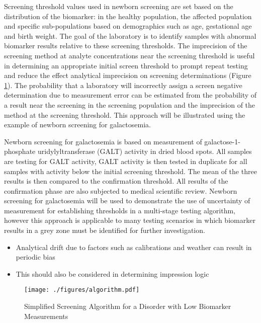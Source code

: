 \documentclass[review]{elsarticle}
\begin{document}
Screening threshold values used in newborn screening are set based on
the distribution of the biomarker: in the healthy population, the
affected population and specific sub-populations based on demographics
such as age, gestational age and birth weight. The goal of the
laboratory is to identify samples with abnormal biomarker results
relative to these screening thresholds. The imprecision of the
screening method at analyte concentrations near the screening
threshold is useful in determining an appropriate initial screen
threshold to prompt repeat testing and reduce the effect analytical
imprecision on screening determinations (Figure \ref{fig:org2d6d78d}). The
probability that a laboratory will incorrectly assign a screen
negative determination due to measurement error can be estimated from
the probability of a result near the screening in the screening
population and the imprecision of the method at the screening
threshold. This approach will be illustrated using the example of
newborn screening for galactosemia.

Newborn screening for galactosemia is based on measurement of
galactose-1-phosphate uridylyltransferase (GALT) activity in dried
blood spots. All samples are testing for GALT activity, GALT activity
is then tested in duplicate for all samples with activity below the
initial screening threshold. The mean of the three results is then
compared to the confirmation threshold. All results of the
confirmation phase are also subjected to medical scientific
review. Newborn screening for galactosemia will be used to demonstrate
the use of uncertainty of measurement for establishing thresholds in a
multi-stage testing algorithm, however this approach is applicable to
many testing scenarios in which biomarker results in a grey zone
must be identified for further investigation.

\begin{itemize}
\item Analytical drift due to factors such as calibrations and weather can
result in periodic bias
\item This should also be considered in determining impression logic
\end{itemize}



\begin{figure}[htbp]
\centering
\texttt{[image: ./figures/algorithm.pdf]}
\caption{\label{fig:org2d6d78d}Simplified Screening Algorithm for a Disorder with Low Biomarker Measurements}
\end{figure}
\end{document}
